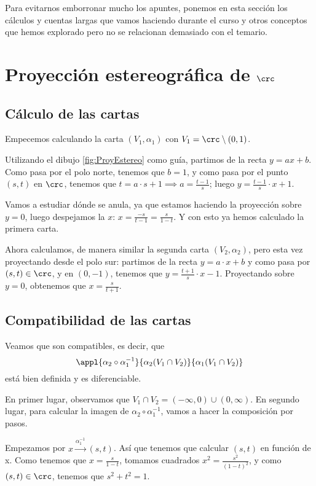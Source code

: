 
Para evitarnos emborronar mucho los apuntes, ponemos en esta sección los cálculos y cuentas largas que vamos haciendo durante el curso y otros conceptos que hemos explorado pero no se relacionan demasiado con el temario.

\section{Proyección estereográfica de $\crc$}
\label{sec:proyeccion_estereografica_crc}

\subsection{Cálculo de las cartas}
Empecemos calculando la carta $(V_1, \alpha_1)$ con $V_1 = \crc \setminus {(0,1)}$.

Utilizando el dibujo \ref{fig:ProyEstereo} como guía, partimos de la recta $y = ax + b$. Como pasa por el polo norte, tenemos que $b = 1$, y como pasa por el punto $(s,t)$ en $\crc$, tenemos que $t=a \cdot s + 1 \implies a = \frac{t-1}{s}$; luego $y = \frac{t-1}{s} \cdot x + 1$.

Vamos a estudiar dónde se anula, ya que estamos haciendo la proyección sobre $y=0$, luego despejamos la $x$: $x = \frac{-s}{t-1} = \frac{s}{1-t}$. Y con esto ya hemos calculado la primera carta.

Ahora calculamos, de manera similar la segunda carta $(V_2, \alpha_2)$, pero esta vez proyectando desde el polo sur: partimos de la recta $y=a \cdot x+b$ y como pasa por $(s,t) \in \crc$, y en $(0,-1)$, tenemos que $y = \frac{t+1}{s} \cdot x - 1$. Proyectando sobre $y=0$, obtenemos que $x = \frac{s}{t+1}$.

\subsection{Compatibilidad de las cartas}
Veamos que son compatibles, es decir, que
\[ \appl{\alpha_2 \circ \alpha_1^{-1}}{\alpha_2(V_1 \cap V_2)}{\alpha_1(V_1 \cap V_2)} \]
está bien definida y es diferenciable.

En primer lugar, observamos que $V_1 \cap V_2 = (-\infty, 0) \cup (0, \infty)$.
En segundo lugar, para calcular la imagen de $\alpha_2 \circ \alpha_1^{-1}$, vamos a hacer la composición por pasos.

Empezamos por $x \xrightarrow{\alpha_1^{-1}} (s,t)$. Así que tenemos que calcular $(s,t)$ en función de x. Como tenemos que $x = \frac{s}{1-t}$, tomamos cuadrados $x^2 = \frac{s^2}{(1-t)^2}$, y como $(s,t) \in \crc$, tenemos que $s^2+t^2=1$.

